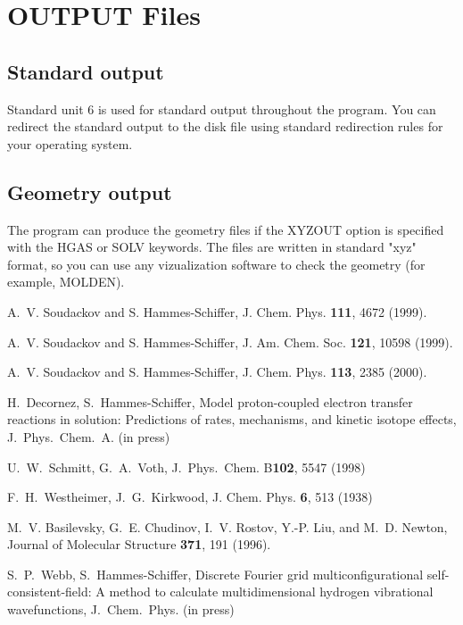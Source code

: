 \documentclass[oneside,11pt,openany]{book}
\newcommand{\tw}{\ttfamily}
\begin{document}
\section{OUTPUT Files}
%
\subsection{Standard output}
Standard unit 6 is used for standard output throughout the program.
You can redirect the standard output to the disk file using standard
redirection rules for your operating system.

\subsection{Geometry output}
The program can produce the geometry files if the {\tw XYZOUT} option
is specified with the {\tw HGAS} or {\tw SOLV} keywords. The files are
written in standard "xyz" format, so you can use any vizualization
software to check the geometry (for example, MOLDEN).


%
\begin{thebibliography}{99}

 A.~V. Soudackov and S. Hammes-Schiffer,
J. Chem. Phys. {\bf 111},  4672 (1999).

 A.~V. Soudackov and S. Hammes-Schiffer,
J. Am. Chem. Soc. {\bf 121}, 10598 (1999).

 A.~V. Soudackov and S. Hammes-Schiffer,
J. Chem. Phys. {\bf 113},  2385 (2000).

 H.~Decornez, S.~Hammes-Schiffer,
Model proton-coupled electron transfer reactions in solution:
Predictions of rates, mechanisms, and kinetic isotope effects,
J.~Phys.~Chem.~A. (in press)

 U.~W.~Schmitt, G.~A.~Voth,
J.~Phys.~Chem. B{\bf 102}, 5547 (1998)

F.~H.~Westheimer, J.~G.~Kirkwood, J. Chem. Phys. {\bf 6}, 513 (1938)

M.~V. Basilevsky, G.~E. Chudinov, I.~V. Rostov, Y.-P. Liu, and M.~D. Newton,
  Journal of Molecular Structure {\bf 371},  191  (1996).

 S.~P.~Webb, S.~Hammes-Schiffer,
Discrete Fourier grid multiconfigurational self-consistent-field:
A method to calculate multidimensional hydrogen vibrational wavefunctions,
J.~Chem.~Phys. (in press)

\end{thebibliography}
\end{document}
